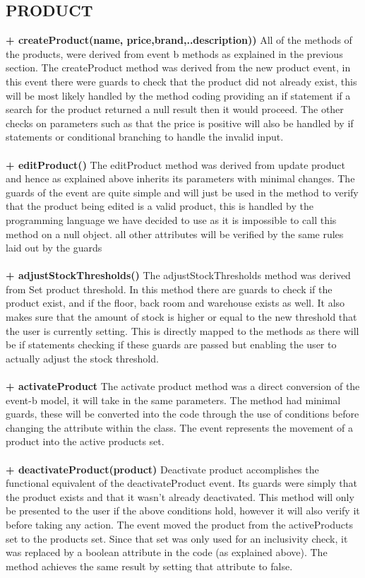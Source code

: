 \documentclass[a4paper]{article}
\begin{document}
\subsection{PRODUCT}
{\bf + createProduct(name, price,brand,..description))}
All of the methods of the products, were derived from event b methods as explained in the previous section. The createProduct method was derived from the new product event, in this event there were guards to check that the product did not already exist, this will be most likely handled by the method coding providing an if statement if a search for the product returned a null result then it would proceed. The other checks on parameters such as that the price is positive will also be handled by if statements or conditional branching to handle the invalid input. 
\\\\
{\bf + editProduct()}
The editProduct method was derived from update product and hence as explained above inherits its parameters with minimal changes. The guards of the event are quite simple and will just be used in the method to verify that the product being edited is a valid product, this is handled by the programming language we have decided to use as it is impossible to call this method on a null object. all other attributes will be verified by the same rules laid out by the guards
\\\\
{\bf + adjustStockThresholds()}
The adjustStockThresholds method was derived from Set product threshold. In this method there are guards to check if the product exist, and if the floor, back room and warehouse exists as well. It also makes sure that the amount of stock is higher or equal to the new threshold that the user is currently setting. This is directly mapped to the methods as there will be if statements checking if these guards are passed but enabling the user to actually adjust the stock threshold. 
\\\\
{\bf + activateProduct}
The activate product method was a direct conversion of the event-b model, it will take in the same parameters. The method had minimal guards, these will be converted into the code through the use of conditions before changing the attribute within the class. The event represents the movement of a product into the active products set. 
\\\\
{\bf + deactivateProduct(product)}
Deactivate product accomplishes the functional equivalent of the deactivateProduct event. Its guards were simply that the product exists and that it wasn't already deactivated. This method will only be presented to the user if the above conditions hold, however it will also verify it before taking any action. The event moved the product from the activeProducts set to the products set. Since that set was only used for an inclusivity check, it was replaced by a boolean attribute in the code (as explained above). The method achieves the same result by setting that attribute to false. 
\\\\
\end{document}
